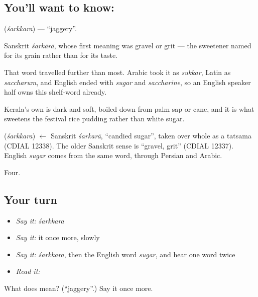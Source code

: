 \subsection*{You'll want to know: }
\textbf{} (\emph{śarkkara}) — \textquotedblleft{}jaggery\textquotedblright{}.

Sanskrit \emph{śarkārā}, whose first meaning was gravel or grit — the sweetener named for its grain rather than for its taste.

That word travelled further than most. Arabic took it as \emph{sukkar}, Latin as \emph{saccharum}, and English ended with \emph{sugar} and \emph{saccharine}, so an English speaker half owns this shelf-word already.

Kerala's own  is dark and soft, boiled down from palm sap or cane, and it is what sweetens the festival rice pudding rather than white sugar.

\begin{cousinweb}
\textbf{} (\emph{śarkkara}) $\leftarrow$ Sanskrit \emph{śarkarā}, \textquotedblleft{}candied sugar\textquotedblright{}, taken over whole as a tatsama (CDIAL 12338). The older Sanskrit sense is \textquotedblleft{}gravel, grit\textquotedblright{} (CDIAL 12337). English \emph{sugar} comes from the same word, through Persian and Arabic.
\end{cousinweb}

\begin{grammarlens}[title={What you've built}]
Four.
\end{grammarlens}

\subsection*{Your turn}
\begin{itemize}
\raggedright
  \item \emph{Say it:} \emph{śarkkara}
  \item \emph{Say it:} it once more, slowly
  \item \emph{Say it:} \emph{śarkkara}, then the English word \emph{sugar}, and hear one word twice
  \item \emph{Read it:} \textbf{}
\end{itemize}

\begin{tcolorbox}[breakable,colback=teal!4,colframe=teal!35!black,title={Before you move on}]
What does  mean? (\textquotedblleft{}jaggery\textquotedblright{}.) Say it once more.
\end{tcolorbox}
